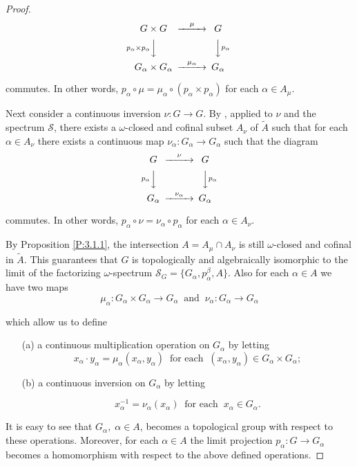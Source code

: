 \documentclass[12pt,draft]{amsart}
\theoremstyle{plain}
\theoremstyle{definition}
\numberwithin{equation}{section}
\begin{document}
\begin{proof}
\[
\begin{CD}
G \times G @>\mu>> G\\
@V{p_{\alpha}\times p_{\alpha}}VV @VV{p_{\alpha}}V\\
G_{\alpha}\times G_{\alpha} @>\mu_{\alpha}>> G_{\alpha}
\end{CD}
\]
\bigskip


\noindent commutes. In other words,
$p_{\alpha}\circ \mu = \mu _{\alpha}\circ (p_{\alpha} \times p_{\alpha})$
for each $\alpha \in A_{\mu}$.


Next consider a continuous inversion $\nu \colon G \to G$. By
\cite[Theorem 1.3.6]{chibook96}, applied to $\nu$ and the
spectrum ${\mathcal S}$,
there exists a $\omega$-closed and cofinal subset
$A_{\nu}$ of $\widetilde{A}$ such that for
each $\alpha \in A_{\nu}$ there exists a continuous map
$\nu _{\alpha} \colon G_{\alpha}  \to G_{\alpha}$
such that the diagram\\

\[
\begin{CD}
G  @>\nu>> G\\
@V{p_{\alpha}}VV @VV{p_{\alpha}}V\\
G_{\alpha} @>\nu_{\alpha}>> G_{\alpha}
\end{CD}
\]
\bigskip

\noindent commutes. In other words,
$p_{\alpha}\circ \nu = \nu_{\alpha} \circ p_{\alpha}$
for each $\alpha \in A_{\nu}$.

By Proposition \ref{P:3.1.1}, the intersection
$A = A_{\mu} \cap A_{\nu}$ is still $\omega$-closed and cofinal
in $\widetilde{A}$. This guarantees that $G$ is topologically
and algebraically isomorphic to the limit of the factorizing
$\omega$-spectrum
${\mathcal S}_{G} = \{ G_{\alpha}, p_{\alpha}^{\beta} , A\}$.
Also for each $\alpha \in A$ we have two maps
\[ \mu_{\alpha} \colon G_{\alpha} \times G_{\alpha} \to
G_{\alpha}\;\;\text{and}\;\; \nu_{\alpha} \colon G_{\alpha}
\to G_{\alpha} \]

\noindent which allow us to define

\begin{itemize}
\item[(a)]
a continuous multiplication operation on 
$G_{\alpha}$ by letting\\
\[ x_{\alpha}\cdot y_{\alpha} = \mu _{\alpha}(x_{\alpha},
y_{\alpha})\;\;
\text{for each}\;\; (x_{\alpha},y_{\alpha}) \in G_{\alpha}
\times G_{\alpha};\]
\medskip
\item[(b)]
a continuous inversion on $G_{\alpha}$ by letting 

\[ x_{\alpha}^{-1} = \nu_{\alpha}(x_{\alpha}) \;\;
\text{for each}\;\; x_{\alpha} \in G_{\alpha} .\]
\medskip
\end{itemize}

It is easy to see that $G_{\alpha},\; \alpha \in A$, becomes a
topological group
with respect to these operations. Moreover, for each $\alpha \in A$
the limit projection $p_{\alpha} \colon G \to G_{\alpha}$ becomes a
homomorphism with respect to the above defined operations.
\end{proof} 
\end{document}
